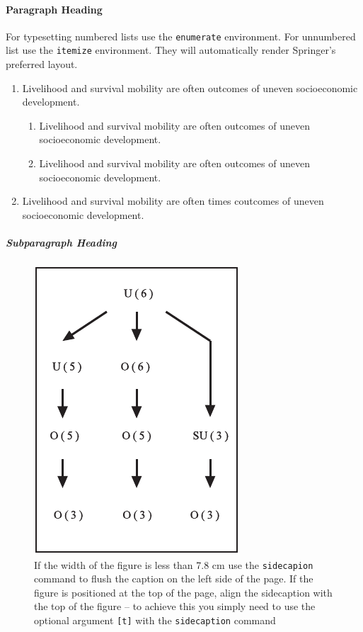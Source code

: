 \documentclass[graybox]{svmult}
\begin{document}
\paragraph{Paragraph Heading} %

For typesetting numbered lists use the \verb|enumerate| environment. For unnumbered list use the \verb|itemize| environment. They will automatically render Springer's preferred layout.

\begin{enumerate}
\item{Livelihood and survival mobility are often outcomes of uneven socioeconomic development.}
\begin{enumerate}
\item{Livelihood and survival mobility are often outcomes of uneven socioeconomic development.}
\item{Livelihood and survival mobility are often outcomes of uneven socioeconomic development.}
\end{enumerate}
\item{Livelihood and survival mobility are often times coutcomes of uneven socioeconomic development.}
\end{enumerate}


\subparagraph{Subparagraph Heading} 

\begin{figure}[t]
\sidecaption[t]
\includegraphics[scale=.65]{figure}
\caption{If the width of the figure is less than 7.8 cm use the \texttt{sidecapion} command to flush the caption on the left side of the page. If the figure is positioned at the top of the page, align the sidecaption with the top of the figure -- to achieve this you simply need to use the optional argument \texttt{[t]} with the \texttt{sidecaption} command}
\label{fig:2}       %
\end{figure}
\end{document}
